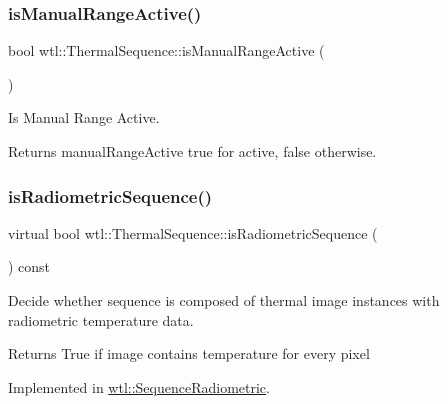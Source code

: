 \subsubsection{\texorpdfstring{is\+Manual\+Range\+Active()}{isManualRangeActive()}}
{\footnotesize\ttfamily bool wtl\+::\+Thermal\+Sequence\+::is\+Manual\+Range\+Active (\begin{DoxyParamCaption}{ }\end{DoxyParamCaption})}



Is Manual Range Active. 

\begin{DoxyReturn}{Returns}
manual\+Range\+Active true for active, false otherwise. 
\end{DoxyReturn}
\mbox{\label{classwtl_1_1_thermal_sequence_a572ec84280f0edc98c5ad0c0a0593335}} 
\subsubsection{\texorpdfstring{is\+Radiometric\+Sequence()}{isRadiometricSequence()}}
{\footnotesize\ttfamily virtual bool wtl\+::\+Thermal\+Sequence\+::is\+Radiometric\+Sequence (\begin{DoxyParamCaption}{ }\end{DoxyParamCaption}) const\hspace{0.3cm}{\ttfamily [pure virtual]}}



Decide whether sequence is composed of thermal image instances with radiometric temperature data. 

\begin{DoxyReturn}{Returns}
True if image contains temperature for every pixel 
\end{DoxyReturn}


Implemented in \hyperlink{classwtl_1_1_sequence_radiometric_aa0b063cfe218f95cd57412344d4f9a04}{wtl\+::\+Sequence\+Radiometric}.

\mbox{\label{classwtl_1_1_thermal_sequence_a85706e752fc1fc7c1748cb2f8bedb42d}} 
